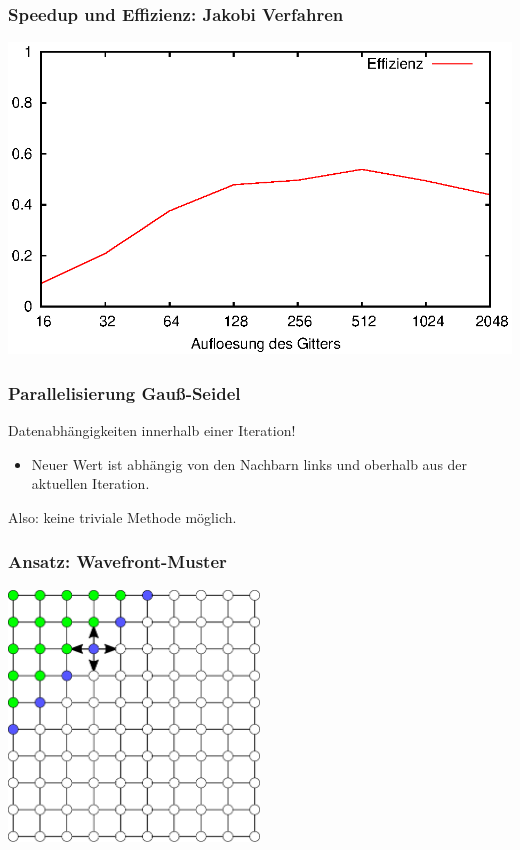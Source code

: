 \documentclass{beamer}
\begin{document}
\begin{frame}
    \frametitle{Speedup und Effizienz: Jakobi Verfahren}
    \includegraphics[width=\textwidth]{plots/effizienzjakobi}
\end{frame}

\begin{frame}
    \frametitle{Parallelisierung Gauß-Seidel}
    Datenabhängigkeiten innerhalb einer Iteration!
    \begin{itemize}
        \item Neuer Wert ist abhängig von den Nachbarn links und oberhalb aus der aktuellen Iteration.
    \end{itemize}
    Also: keine triviale Methode möglich.
\end{frame}

\begin{frame}
    \frametitle{Ansatz: Wavefront-Muster}
    \begin{center}
        \includegraphics[width=0.5\textwidth]{wavefront-datadependencies}
    \end{center}
\end{frame}
\end{document}
